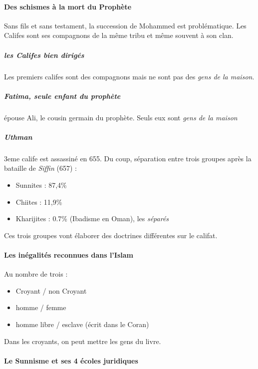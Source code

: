 \paragraph{Des schismes à la mort du Prophète} Sans fils et sans testament, la succession de Mohammed est problématique. Les Califes sont ses compagnons de la même tribu et même souvent à son clan. 

\subparagraph{les Califes bien dirigés} Les premiers califes sont des compagnons mais ne sont pas des \textit{ gens de la maison}.
 
\subparagraph{Fatima, seule enfant du prophète} épouse Ali, le cousin germain du prophète. Seuls eux sont \textit{gens de la maison}

\subparagraph{Uthman} 3eme calife est assassiné en 655. Du coup, séparation entre trois groupes après la bataille de \textit{Siffin} (657) : 

\begin{itemize}
\item Sunnites : 87,4\%
\item Chiites : 11,9\%
\item Kharijites : 0.7\% (Ibadisme en Oman), les \textit{séparés}
\end{itemize}

Ces trois groupes vont élaborer des doctrines différentes sur le califat.

\paragraph{Les inégalités reconnues dans l'Islam}
Au nombre de trois :  
\begin{itemize}
\item Croyant / non Croyant
\item homme / femme
\item homme libre / esclave (écrit dans le Coran)
\end{itemize}
Dans les croyants, on peut mettre les gens du livre. 

\paragraph{Le Sunnisme et ses 4 écoles juridiques}

